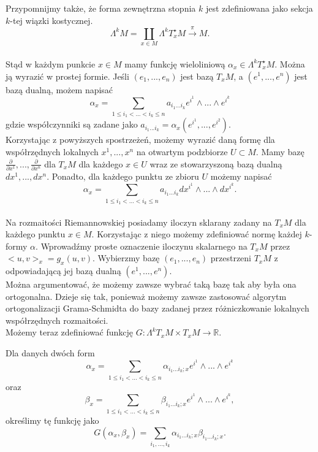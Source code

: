 \documentclass[licencjacka]{pracamgr}
\theoremstyle{definition}
\theoremstyle{definition}
\theoremstyle{plain}
\theoremstyle{plain}
\begin{document}
Przypomnijmy także, że forma zewnętrzna stopnia $k$ jest zdefiniowana jako 
sekcja $k$-tej wiązki kostycznej.
\[
    \Lambda^k M = \coprod_{x \in M} 
    \Lambda^k T_x^\star M \xrightarrow{\pi} M.
\] \\

Stąd w każdym punkcie $x \in M$ mamy funkcję wieloliniową $\alpha_x \in
\Lambda^k T_x^\star M$. Można ją wyrazić w prostej formie.
Jeśli $(e_1, ..., e_n)$ jest bazą $T_x M$, a  $(e^1, ..., e^n)$ jest bazą dualną,
możem napisać
\[
    \alpha_x = \sum_{1 \leq i_1 < ... < i_k \leq n} a_{i_1 ... i_k} e^{i^1} \wedge ...
    \wedge e^{i^k}
\] 
gdzie współczynniki są zadane jako
$a_{i_1 ... i_k} = \alpha_x(e^{i^1}, ..., e^{i^2})$. \\

Korzystając z powyższych spostrzeżeń, możemy wyrazić daną formę dla 
współrzędnych lokalnych $x^1, ..., x^n$
na otwartym podzbiorze $U \subset M$.  Mamy bazę
$\frac{\partial}{\partial x^1}, ..., \frac{\partial}{\partial x^n}$ dla $T_x M$
dla każdego $x \in U$ wraz ze stowarzyszoną bazą dualną $dx^1, ..., dx^n$.
Ponadto, dla każdego punktu ze zbioru $U$ możemy napisać
\[
    \alpha_x = \sum_{1 \leq i_1 < ... < i_k \leq n} a_{i_1 ... i_k}
       dx^{i^1} \wedge ...  \wedge dx^{i^k}.
\]  \\

Na rozmaitości Riemannowskiej posiadamy iloczyn sklarany zadany na 
$T_x M$ dla każdego punktu $x \in M$.
Korzystając z niego możemy zdefiniować normę każdej $k$-formy
$\alpha$.  Wprowadźmy proste oznaczenie iloczynu skalarnego na $T_x M$
przez $<u, v>_x = g_x(u, v)$.
Wybierzmy bazę $(e_1, ..., e_n)$ przestrzeni $T_x M$ z odpowiadającą
jej bazą dualną $(e^1, ..., e^n)$. \\

Można argumentować, że możemy zawsze wybrać taką bazę tak aby była ona
ortogonalna.  Dzieje się tak, ponieważ możemy zawsze zastosować
algorytm ortogonalizacji Grama-Schmidta do bazy zadanej przez
różniczkowanie lokalnych współrzędnych rozmaitości. \\

Możemy teraz zdefiniować funkcję
$G: \Lambda^k T_x M \times T_x M \rightarrow \mathbb{R}$.

Dla danych dwóch form
\[
\alpha_x = \sum_{1 \leq i_1 < ... < i_k \leq n} \alpha_{i_1 ... i_k; x} e^{i^1}
\wedge ...  \wedge e^{i^k}
\]
 oraz
\[ \beta_x = \sum_{1 \leq i_1 < ... < i_k \leq n} \beta_{i_1 ... i_k; x} e^{i^1}
\wedge ...  \wedge e^{i^k},
\]
określimy tę funkcję jako
\[
    G(\alpha_x, \beta_x) = \sum_{i_1, ..., i_k} \alpha_{i_1 ... i_k; x}
                                                    \beta_{i_1 ... i_k; x}.
\] \\
\end{document}
